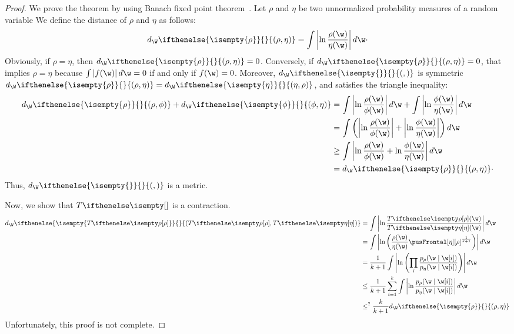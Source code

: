 \begin{proof}
    \renewcommand{\d}[2]{d_{\W} \ifthenelse{\isempty{#1}}{}{\left( #1, #2 \right)}}
    \newcommand{\dExpand}[2]{\intAbs{\lnfrac{#1}{#2}}}
    \newcommand{\lnfrac}[2]{\ln \frac{#1(\w)}{#2(\w)}}
    \newcommand{\intAbs}[1]{\int \left| #1 \right| d\w}
    \newcommand{\p}{\rho}
    \newcommand{\q}{\eta}
    \renewcommand{\r}{\phi}
    We prove the theorem by using Banach fixed point theorem~\cite{Agarwal2018}.
    Let $\p$ and $\q$ be two unnormalized probability measures of a random variable \w
    We define the distance of $\p$ and $\q$ as follows:
    \begin{equation}
        \d{\p}{\q} = \dExpand{\p}{\q} \cdot
        \label{eq:d_metric}
    \end{equation}
    Obviously, if $\p = \q$, then $\d{\p}{\q} = 0$.
    Conversely, if $\d{\p}{\q} = 0$, that implies  $\p = \q$ because $\intAbs{f(\w)} = 0$ if and only if $f(\w) = 0$.
    Moreover, $\d{}{}$ is symmetric $\d{\p}{\q} = \d{\q}{\p}$, and satisfies the triangle inequality:
    \begin{align*}
        \d{\p}{\r} + \d{\r}{\q} &= \dExpand{\p}{\r} + \dExpand{\r}{\q} \\
        &= \int \left( \left| \lnfrac{\p}{\r} \right| + \left| \lnfrac{\r}{\q} \right| \right) d\w \\
        &\geq \intAbs{\lnfrac{\p}{\r} + \lnfrac{\r}{\q}} \\
        &= \d{\p}{\q} \cdot
    \end{align*}
    Thus, $\d{}{}$ is a metric.

    Now, we show that $\fpMap{}$ is a contraction.
    \begin{align*}
        \d{\fpMap{\p}}{\fpMap{\q}} &= \dExpand{\fpMap{\p}}{\fpMap{\q}} \\
        &= \intAbs{ \ln \left( \frac{\p(\w)}{\q(\w)} \pusFrontal[\q][\p]^{\frac{1}{k+1}} \right) }\\
        &= \frac{1}{k+1} \intAbs{ \ln \left( \prod_i \frac{p_{\p}(\w \mid \w[i])}{p_{\q}(\w \mid \w[i])} \right)} \\
        &\leq \frac{1}{k+1} \sum_{i=1}^{k} \intAbs{\ln \frac{p_{\p}(\w \mid \w[i])}{p_{\q}(\w \mid \w[i])}} \\
        &\leq^{?} \frac{k}{k+1} \d{\p}{\q}
    \end{align*}
    Unfortunately, this proof is not complete.
\end{proof}

